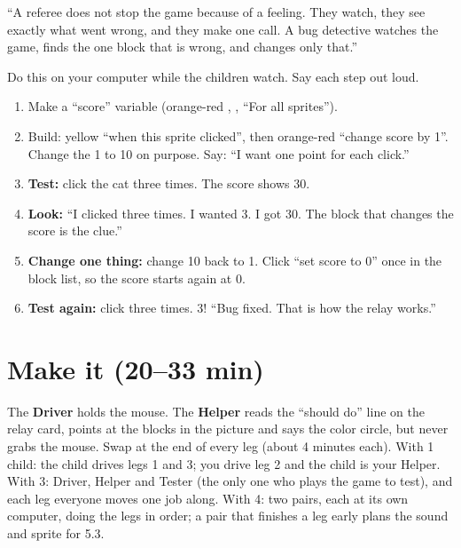 \begin{analogy}
\enquote{A referee does not stop the game because of a feeling. They watch, they see exactly what went wrong, and they make one call. A bug detective watches the game, finds the one block that is wrong, and changes only that.}
\end{analogy}

\begin{workedexample}
Do this on your computer while the children watch. Say each step out loud.
\begin{enumerate}[leftmargin=1.4em,itemsep=1pt]
  \item Make a \enquote{score} variable (orange-red , , \enquote{For all sprites}).
  \item Build: yellow  \enquote{when this sprite clicked}, then orange-red  \enquote{change score by 1}. Change the 1 to 10 on purpose. Say: \enquote{I want one point for each click.}
  \item \textbf{Test:} click the cat three times. The score shows 30.
  \item \textbf{Look:} \enquote{I clicked three times. I wanted 3. I got 30. The block that changes the score is the clue.}
  \item \textbf{Change one thing:} change 10 back to 1. Click \enquote{set score to 0} once in the block list, so the score starts again at 0.
  \item \textbf{Test again:} click three times. 3! \enquote{Bug fixed. That is how the relay works.}
\end{enumerate}
\begin{center}
\begin{scratch}[scale=0.85]
\end{scratch}
\end{center}
\end{workedexample}

\section{Make it (20--33 min)}
\begin{pairroles}
The \textbf{Driver} holds the mouse. The \textbf{Helper} reads the \enquote{should do} line on the relay card, points at the blocks in the picture and says the color circle, but never grabs the mouse. Swap at the end of every leg (about 4 minutes each). With 1 child: the child drives legs 1 and 3; you drive leg 2 and the child is your Helper. With 3: Driver, Helper and Tester (the only one who plays the game to test), and each leg everyone moves one job along. With 4: two pairs, each at its own computer, doing the legs in order; a pair that finishes a leg early plans the sound and sprite for 5.3.
\end{pairroles}

